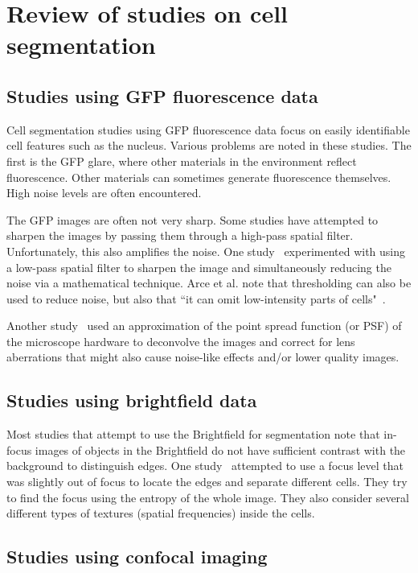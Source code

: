 \section{Review of studies on cell segmentation}

\subsection{Studies using GFP fluorescence data}

Cell segmentation studies using GFP fluorescence data focus on easily identifiable cell features such as the nucleus. Various problems are noted in these studies. The first is the GFP glare, where other materials in the environment reflect fluorescence. Other materials can sometimes generate fluorescence themselves. High noise levels are often encountered.

The GFP images are often not very sharp. Some studies have attempted to sharpen the images by passing them through a high-pass spatial filter. Unfortunately, this also amplifies the noise. One study~\cite{arce} experimented with using a low-pass spatial filter to sharpen the image and simultaneously reducing the noise via a mathematical technique. Arce et al. note that thresholding can also be used to reduce noise, but also that ``it can omit low-intensity parts of cells"~\cite{arce}.

Another study~\cite{rizk} used an approximation of the point spread function (or PSF) of the microscope hardware to deconvolve the images and correct for lens aberrations that might also cause noise-like effects and/or lower quality images.

\subsection{Studies using brightfield data}

Most studies that attempt to use the Brightfield for segmentation note that in-focus images of objects in the Brightfield do not have sufficient contrast with the background to distinguish edges. One study~\cite{ali} attempted to use a focus level that was slightly out of focus to locate the edges and separate different cells. They try to find the focus using the entropy of the whole image. They also consider several different types of textures (spatial frequencies) inside the cells.

\subsection{Studies using confocal imaging}

